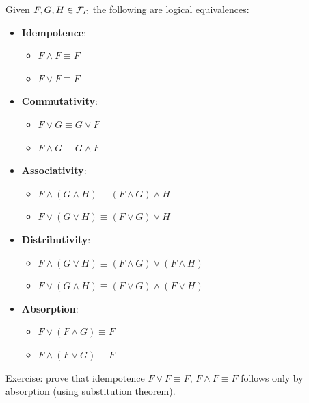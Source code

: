 	\begin{theorem}
	Given $F,G,H \in \mathcal{F}_\mathcal{L}$ the following are logical equivalences:
	\begin{itemize}
		\item \textbf{Idempotence}:
		  \begin{itemize}
			\item $F \wedge F \equiv F$
			\item $F \vee F \equiv F$
		  \end{itemize}
		\item \textbf{Commutativity}:
		  \begin{itemize}
			\item $F \vee G \equiv G \vee F$
			\item $F \wedge G \equiv G \wedge F$
		  \end{itemize}
		\item \textbf{Associativity}:
		  \begin{itemize}
			\item $F \wedge (G \wedge H) \equiv (F \wedge G) \wedge H$
			\item $F \vee (G \vee H) \equiv (F \vee G) \vee H$
		  \end{itemize}
		\item \textbf{Distributivity}:
		  \begin{itemize}
			\item $F \wedge (G \vee H) \equiv (F \wedge G) \vee (F \wedge H)$
			\item $F \vee (G \wedge H) \equiv (F \vee G) \wedge (F \vee H)$
		  \end{itemize}
		\item \textbf{Absorption}:
		  \begin{itemize}
			\item $F \vee (F \wedge G) \equiv F$
			\item $F \wedge (F \vee G) \equiv F$
		  \end{itemize}
	\end{itemize}
	\end{theorem}


	Exercise: prove that idempotence $F \vee F \equiv F$, $F \wedge F \equiv F$ follows only by absorption (using substitution theorem).

